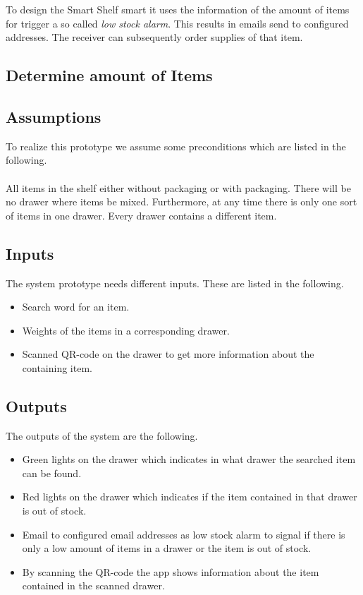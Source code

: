 \documentclass{sigchi}
\begin{document}
To design the Smart Shelf \glqq{}smart\grqq{} it uses the information of the amount of items for trigger a so called \textit{low stock alarm}. 
This results in emails send to configured addresses. 
The receiver can subsequently order supplies of that item. 


\subsection{Determine amount of Items}



\subsection{Assumptions}
To realize this prototype we assume some preconditions which are listed in the following.
\\
\\
All items in the shelf either without packaging or with packaging. 
There will be no drawer where items be mixed. 
Furthermore, at any time there is only one sort of items in one drawer. 
Every drawer contains a different item. 


\subsection{Inputs}
The system prototype needs different inputs. 
These are listed in the following. 
%
\begin{itemize}
	\item Search word for an item. 
	\item Weights of the items in a corresponding drawer. 
	\item Scanned QR-code on the drawer to get more information about the containing item. 
\end{itemize}


\subsection{Outputs}
The outputs of the system are the following. 
%
\begin{itemize}
	\item Green lights on the drawer which indicates in what drawer the searched item can be found. 
	\item Red lights on the drawer which indicates if the item contained in that drawer is out of stock. 
	\item Email to configured email addresses as \glqq{}low stock alarm\grqq{} to signal if there is only a low amount of items in a drawer or the item is out of stock. 
	\item By scanning the QR-code the app shows information about the item contained in the scanned drawer. 
\end{itemize}
\end{document}
